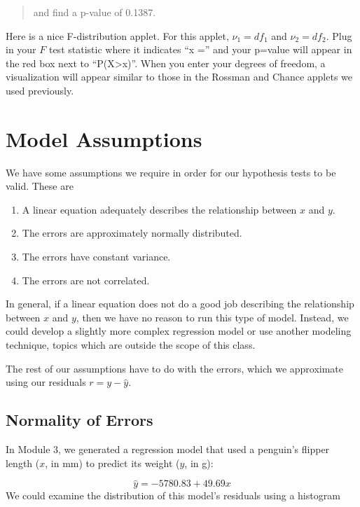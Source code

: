 \documentclass[
]{book}
\providecommand{\tightlist}{%
  \setlength{\itemsep}{0pt}\setlength{\parskip}{0pt}}
\begin{document}
\begin{quote}
and find a p-value of 0.1387.
\end{quote}

Here is a nice F-distribution applet. For this applet, \(\nu_1 = df_1\) and \(\nu_2 = df_2\). Plug in your \(F\) test statistic where it indicates ``x ='' and your p=value will appear in the red box next to ``P(X\textgreater x)''. When you enter your degrees of freedom, a visualization will appear similar to those in the Rossman and Chance applets we used previously.

\section{Model Assumptions}\label{model-assumptions}

We have some assumptions we require in order for our hypothesis tests to be valid. These are

\begin{enumerate}
\def\labelenumi{\arabic{enumi}.}
\tightlist
\item
  A linear equation adequately describes the relationship between \(x\) and \(y\).
\item
  The errors are approximately normally distributed.
\item
  The errors have constant variance.
\item
  The errors are not correlated.
\end{enumerate}

In general, if a linear equation does not do a good job describing the relationship between \(x\) and \(y\), then we have no reason to run this type of model. Instead, we could develop a slightly more complex regression model or use another modeling technique, topics which are outside the scope of this class.

The rest of our assumptions have to do with the errors, which we approximate using our residuals \(r = y-\hat{y}\).

\subsection{Normality of Errors}\label{normality-of-errors}

In Module 3, we generated a regression model that used a penguin's flipper length (\(x\), in mm) to predict its weight (\(y\), in g):

\[\hat{y}=-5780.83 + 49.69x\]
We could examine the distribution of this model's residuals using a histogram
\end{document}
